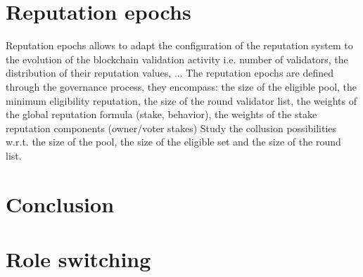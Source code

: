\documentclass[]{article}
\begin{document}
\section{Reputation epochs}
\label{sec:epoch}
Reputation epochs allows to adapt the configuration of the reputation system to the evolution of the blockchain validation activity i.e. number of validators, the distribution of their reputation values, ...
The reputation epochs are defined through the governance process, they encompass: the size of the eligible pool, the minimum eligibility reputation, the size of the round validator list, the weights of the global reputation formula (stake, behavior), the weights of the stake reputation components (owner/voter stakes)
Study the collusion possibilities w.r.t. the size of the pool, the size of the eligible set and the size of the round list. 

\section{Conclusion}
\label{sec:conclusion}




\appendix
\section{Role switching}
\label{app:rs}
\end{document}
